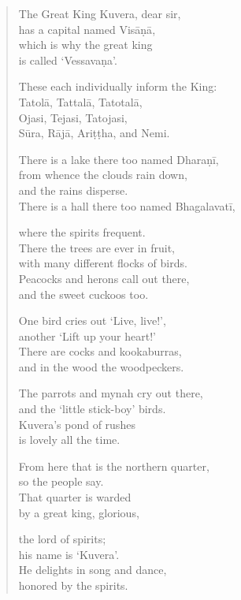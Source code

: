 \documentclass[12pt,openany]{book}%
\begin{document}
\begin{verse}
The Great King Kuvera, dear sir, \\
has a capital named \textsanskrit{Visāṇā}, \\
which is why the great king \\
is called ‘\textsanskrit{Vessavaṇa}’. 

These each individually inform the King: \\
\textsanskrit{Tatolā}, \textsanskrit{Tattalā}, \textsanskrit{Tatotalā}, \\
Ojasi, Tejasi, Tatojasi, \\
\textsanskrit{Sūra}, \textsanskrit{Rājā}, \textsanskrit{Ariṭṭha}, and Nemi. 

There is a lake there too named \textsanskrit{Dharaṇī}, \\
from whence the clouds rain down, \\
and the rains disperse. \\
There is a hall there too named \textsanskrit{Bhagalavatī}, 

where the spirits frequent. \\
There the trees are ever in fruit, \\
with many different flocks of birds. \\
Peacocks and herons call out there, \\
and the sweet cuckoos too. 

One bird cries out ‘Live, live!’, \\
another ‘Lift up your heart!’ \\
There are cocks and kookaburras, \\
and in the wood the woodpeckers. 

The parrots and mynah cry out there, \\
and the ‘little stick-boy’ birds. \\
Kuvera’s pond of rushes \\
is lovely all the time. 

From here that is the northern quarter, \\
so the people say. \\
That quarter is warded \\
by a great king, glorious, 

the lord of spirits; \\
his name is ‘Kuvera’. \\
He delights in song and dance, \\
honored by the spirits. 


\end{verse}
\end{document}
